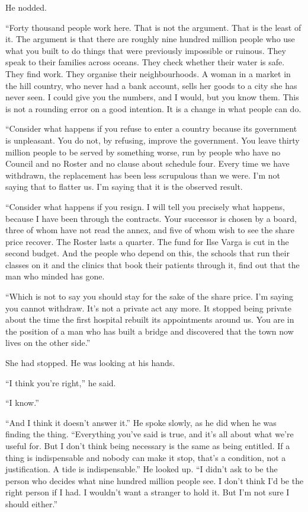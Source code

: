 He nodded.

``Forty thousand people work here. That is not the argument. That is the least of it. The argument is that there are roughly nine hundred million people who use what you built to do things that were previously impossible or ruinous. They speak to their families across oceans. They check whether their water is safe. They find work. They organise their neighbourhoods. A woman in a market in the hill country, who never had a bank account, sells her goods to a city she has never seen. I could give you the numbers, and I would, but you know them. This is not a rounding error on a good intention. It is a change in what people can do.

``Consider what happens if you refuse to enter a country because its government is unpleasant. You do not, by refusing, improve the government. You leave thirty million people to be served by something worse, run by people who have no Council and no Roster and no clause about schedule four. Every time we have withdrawn, the replacement has been less scrupulous than we were. I'm not saying that to flatter us. I'm saying that it is the observed result.

``Consider what happens if you resign. I will tell you precisely what happens, because I have been through the contracts. Your successor is chosen by a board, three of whom have not read the annex, and five of whom wish to see the share price recover. The Roster lasts a quarter. The fund for Ilse Varga is cut in the second budget. And the people who depend on this, the schools that run their classes on it and the clinics that book their patients through it, find out that the man who minded has gone.

``Which is not to say you should stay for the sake of the share price. I'm saying you cannot withdraw. It's not a private act any more. It stopped being private about the time the first hospital rebuilt its appointments around us. You are in the position of a man who has built a bridge and discovered that the town now lives on the other side.''

She had stopped. He was looking at his hands.

``I think you're right,'' he said.

``I know.''

``And I think it doesn't answer it.'' He spoke slowly, as he did when he was finding the thing. ``Everything you've said is true, and it's all about what we're useful for. But I don't think being necessary is the same as being entitled. If a thing is indispensable and nobody can make it stop, that's a condition, not a justification. A tide is indispensable.'' He looked up. ``I didn't ask to be the person who decides what nine hundred million people see. I don't think I'd be the right person if I had. I wouldn't want a stranger to hold it. But I'm not sure I should either.''

